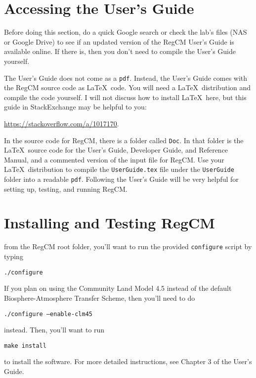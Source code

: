 \section{Accessing the User's Guide}
	Before doing this section, do a quick Google search or check the lab's files (NAS or Google Drive) to see if an updated version of the RegCM User's Guide is available online.
	If there is, then you don't need to compile the User's Guide yourself.

	The User's Guide does not come as a \texttt{pdf}.
	Instead, the User's Guide comes with the RegCM source code as \LaTeX\ code.
	You will need a \LaTeX\ distribution and compile the code yourself.
	I will not discuss how to install \LaTeX\ here, but this guide in StackExchange may be helpful to you:
	\begin{center}
		\url{https://stackoverflow.com/a/1017170}.
	\end{center}

	In the source code for RegCM, there is a folder called \texttt{Doc}.
	In that folder is the \LaTeX\ source code for the User's Guide, Developer Guide, and Reference Manual, and a commented version of the input file for RegCM.
	Use your \LaTeX\ distribution to compile the \texttt{UserGuide.tex} file under the \texttt{UserGuide} folder into a readable \texttt{pdf}.
	Following the User's Guide will be very helpful for setting up, testing, and running RegCM.
	
\section{Installing and Testing RegCM}
	from the RegCM root folder, you'll want to run the provided \texttt{configure} script by typing
	\begin{center}
		\texttt{./configure}
	\end{center}
	If you plan on using the Community Land Model 4.5 instead of the default Biosphere-Atmosphere Transfer Scheme, then you'll need to do 
	\begin{center}
		\texttt{./configure --enable-clm45}
	\end{center}
	instead.
	Then, you'll want to run
	\begin{center}
		\texttt{make install}
	\end{center}
	to install the software.
	For more detailed instructions, see Chapter 3 of the User's Guide.

